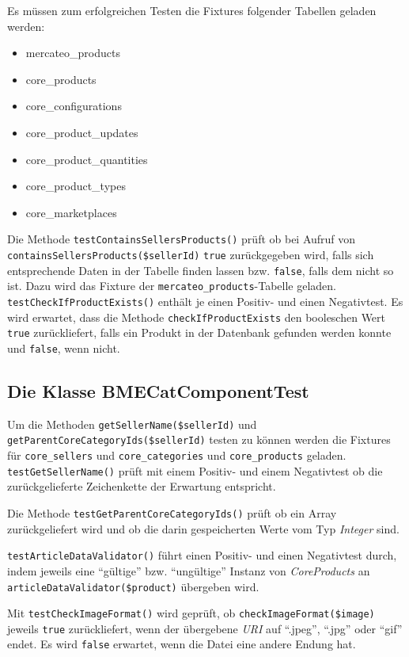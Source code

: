 {	Es müssen zum erfolgreichen Testen die Fixtures folgender Tabellen geladen werden:
	\begin{itemize}[nosep]
	\item mercateo\_products
    \item core\_products
    \item core\_configurations
    \item core\_product\_updates
    \item core\_product\_quantities
    \item core\_product\_types
    \item core\_marketplaces
	     
	\end{itemize} 
	Die Methode \texttt{testContainsSellersProducts()} prüft ob bei Aufruf von \texttt{containsSellersProducts\-(\$sellerId)} \texttt{true} zurückgegeben wird, falls sich entsprechende Daten in der Tabelle finden lassen bzw. \texttt{false}, falls dem nicht so ist. Dazu wird das Fixture der \texttt{mercateo\_products}-Tabelle geladen.
	\texttt{testCheckIfProductExists()} enthält je einen Positiv- und einen Negativtest. Es wird erwartet, dass die Methode \texttt{checkIfProductExists} den booleschen Wert \texttt{true} zurückliefert, falls ein Produkt in der Datenbank gefunden werden konnte und \texttt{false}, wenn nicht.
	
	\subsection{Die Klasse BMECatComponentTest}
	
	Um die Methoden \texttt{getSellerName(\$sellerId)} und \texttt{getParentCoreCategoryIds(\$sellerId)} testen zu können werden die Fixtures für \texttt{core\_sellers} und \texttt{core\_categories} und \texttt{core\_products} geladen.
	\texttt{testGetSellerName()} prüft mit einem Positiv- und einem Negativtest ob die zurückgelieferte Zeichenkette der Erwartung entspricht.
	
	Die Methode \texttt{testGetParentCoreCategoryIds()} prüft ob ein Array zurückgeliefert wird und ob die darin gespeicherten Werte vom Typ \textit{Integer} sind.
	
	\texttt{testArticleDataValidator()} führt einen Positiv- und einen Negativtest durch, indem jeweils eine \enquote{gültige} bzw. \enquote{ungültige} Instanz von \textit{CoreProducts} an \texttt{articleDataValidator(\$product)} übergeben wird.
	
	Mit \texttt{testCheckImageFormat()} wird geprüft, ob \texttt{checkImageFormat(\$image)} jeweils \texttt{true} zurückliefert, wenn der übergebene \textit{URI} auf \enquote{.jpeg}, \enquote{.jpg} oder \enquote{gif} endet. Es wird \texttt{false} erwartet, wenn die Datei eine andere Endung hat.
	
}
